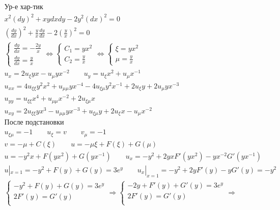 \begin{enumerate}
  \begin{gather*}
    \text{Ур-е хар-тик} \\
    x^{2}(dy)^{2}+xydxdy-2y^{2}(dx)^{2} = 0 \\
    ( \frac{dy}{dx})^{2}+ \frac{y}{x} \frac{dy}{dx} -2 (\frac{y}{x})^{2}=0 \\
    \begin{cases}
     \frac{dy}{dx}= -\frac{2y}{x} \\ \frac{dy}{dx} =  \frac{y}{x} 
    \end{cases} \Leftrightarrow
    \begin{cases}
      C_{1} = yx^{2} \\ C_{2} = \frac{y}{x}
    \end{cases} \Leftrightarrow
    \begin{cases}
      \xi = yx^{2} \\ \mu = \frac{y}{x} 
    \end{cases} \\
    u_{x} = 2u_{\xi}yx - u_{\mu}yx^{-2} \qquad u_{y} = u_{\xi}x^{2}+u_{\mu}x^{-1} \\
    u_{xx} = 4u_{\xi\xi}y^{2}x^{2}+u_{\mu\mu}yx^{-4}-4u_{\xi\mu}y^{2}x^{-1}+2u_{\xi}y+2u_{\mu}
    yx^{-3} \\
    u_{yy}= u_{\xi\xi}x^{4}+u_{\mu\mu}x^{-2}+2u_{\xi\mu}x \\
    u_{xy}=2u_{\xi\xi}yx^{3}-u_{\mu\mu}yx^{-3}+u_{\xi\mu}y+2u_{\xi}x-u_{\mu}x^{-2} \\
    \text{После подстановки} \\
    u_{\xi\mu} = -1 \qquad u_{\xi} = v \qquad v_{\mu} = -1 \\
    v = -\mu + C(\xi) \qquad u = -\mu\xi + F(\xi)+G(\mu) \\
    u = -y^{2}x +F(yx^{2})+G(yx^{-1}) \qquad  u_{x}=-y^{2}+2yxF'(yx^{2}) -yx^{-2}G'(yx^{-1}) \\
    u|_{x=1}=-y^{2}+F(y)+G(y) = 3e^{y} \qquad u_{x}|_{x=1}=-y^{2}+2yF'(y)-yG'(y) = -y^{2} \\
   \begin{cases}
    -y^{2}+F(y)+G(y) = 3e^{y} \\ 2F'(y)=G'(y) \\
   \end{cases} \Rightarrow
   \begin{cases}
   -2y + F'(y)+G'(y)=3e^{y} \\ 2F'(y)=G'(y) \\
   \end{cases} \Rightarrow \\

\end{gather*}
\end{enumerate}
